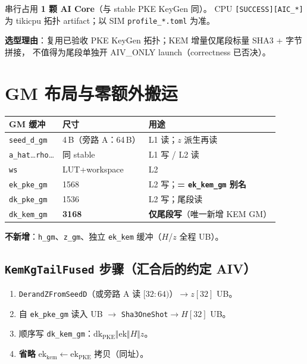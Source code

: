 \documentclass[UTF8,a4paper,11pt]{ctexart}
\begin{document}
串行占用 \textbf{1 颗 AI Core}（与 stable PKE KeyGen 同）。
CPU \texttt{[SUCCESS][AIC\_*]} 为 tikicpu 拓扑 artifact；以 SIM \texttt{profile\_*.toml} 为准。

\textbf{选型理由}：复用已验收 PKE KeyGen 拓扑；KEM 增量仅尾段标量 SHA3 + 字节拼接，
不值得为尾段单独开 AIV\_ONLY launch（correctness 已否决）。

\section{GM 布局与零额外搬运}
\label{sec:gm}

\begin{longtable}{@{}L{3.4cm}L{2.0cm}L{7.4cm}@{}}
\toprule
GM 缓冲 & 尺寸 & 用途 \\
\midrule
\texttt{seed\_d\_gm} & 4\,B（旁路 A：64\,B） & L1 读；$z$ 派生再读 \\
\texttt{a\_hat}…\texttt{rho}… & 同 stable & L1 写 / L2 读 \\
\texttt{ws} & LUT+workspace & L2 \\
\texttt{ek\_pke\_gm} & 1568 & L2 写；\textbf{= \texttt{ek\_kem\_gm} 别名} \\
\texttt{dk\_pke\_gm} & 1536 & L2 写；尾段读 \\
\texttt{dk\_kem\_gm} & \textbf{3168} & \textbf{仅尾段写}（唯一新增 KEM GM） \\
\bottomrule
\end{longtable}

\textbf{不新增}：\texttt{h\_gm}、\texttt{z\_gm}、独立 \texttt{ek\_kem} 缓冲（$H$/$z$ 全程 UB）。

\subsection{\texttt{KemKgTailFused} 步骤（汇合后的约定 AIV）}

\begin{enumerate}
  \item \texttt{DerandZFromSeedD}（或旁路 A 读 $[32:64)$）$\to z[32]$ UB。
  \item 自 \texttt{ek\_pke\_gm} 读入 UB $\to$ \texttt{Sha3OneShot}$\to H[32]$ UB。
  \item 顺序写 \texttt{dk\_kem\_gm}：$\mathrm{dk}_{\mathrm{PKE}}\Vert\mathrm{ek}\Vert H\Vert z$。
  \item \textbf{省略} $\mathrm{ek}_{\mathrm{kem}}\leftarrow\mathrm{ek}_{\mathrm{PKE}}$ 拷贝（同址）。
\end{enumerate}
\end{document}
